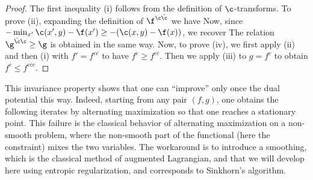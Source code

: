 \begin{proof} The first inequality (i) follows from the definition of $\c$-transforms. To prove (ii), expanding the definition of $\f^{\c\bar{\c}}$ we have
Now, since $-\min_{x'} \c(x',y) - \f(x') \geq -(\c(x,y)-\f(x))$, we recover 
The relation $\g^{\bar{\c}\c} \geq \g$ is obtained in the same way. 
%
Now, to prove (iv), we first apply (ii) and then (i) with $f'=f^{c\bar c}$ to have $f^c \geq f^{c \bar c}$.
Then we apply (iii) to $g=f^c$ to obtain $f^c \leq f^{c\bar c c}$. 
\end{proof}

This invariance property shows that one can ``improve'' only once the dual potential this way. Indeed, starting from any pair $(f,g)$, one obtains the following iterates by alternating maximization
so that one reaches a stationary point. 
%
This failure is the classical behavior of alternating maximization on a non-smooth problem, where the non-smooth part of the functional (here the constraint) mixes the two variables. 
% 
The workaround is to introduce a smoothing, which is the classical method of augmented Lagrangian, and that we will develop here using entropic regularization, and corresponds to Sinkhorn's algorithm. 


  
  